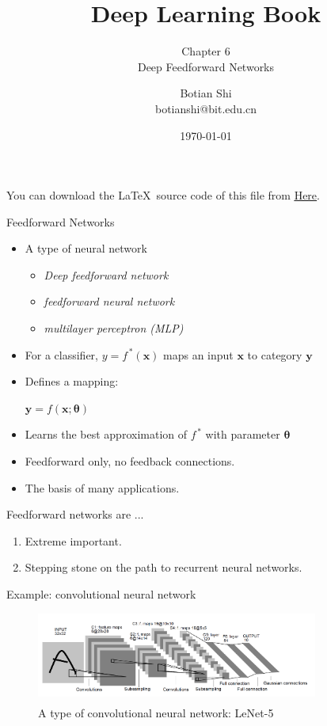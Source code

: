 \documentclass[10pt]{beamer}
\newcommand{\supercite}[1]{\textsuperscript{\textsuperscript{\cite{#1}}}}
\begin{document}
	\title{Deep Learning Book}
	\subtitle{Chapter 6 \\ Deep Feedforward Networks}
	\author{Botian Shi \\ botianshi@bit.edu.cn}
	\date{\today}

	\begin{frame}[plain]
		\titlepage
	\end{frame}

	\begin{frame}
		You can download the \LaTeX\, source code of this file from \href{https://github.com/friskit-china/DLBookSlides}{\underline{Here}}.
	\end{frame}
	
	\begin{frame}{Feedforward Networks}
		
		\begin{itemize}
			\item A type of neural network
				\begin{itemize}
					\item \emph{Deep feedforward network}
					\item \emph{feedforward neural network}
					\item \emph{multilayer perceptron (MLP)}
				\end{itemize}
			\item For a classifier, $y = f^{\,*}(\bm{x})$ maps an input $\bm{x}$ to category $\bm{y}$
			\item Defines a mapping:
					\begin{center}
						$\bm{y}=f(\bm{x};\bm{\theta})$
					\end{center}
			\item Learns the best approximation of $f^{\,*}$ with parameter $\bm{\theta}$
			\item Feedforward only, no feedback connections.
			\item The basis of many applications.
		\end{itemize}
	\end{frame}

	\begin{frame}{Feedforward networks are ...}
		\begin{enumerate}
			\item Extreme important.
			\item Stepping stone on the path to recurrent neural networks.
		\end{enumerate}
		\begin{exampleblock}{Example: convolutional neural network}
			\begin{figure}
				\includegraphics[width=25em]{figures/lenet-5.png}
				\caption{A type of convolutional neural network: LeNet-5\supercite{lecun1998gradient}}
			\end{figure}
		\end{exampleblock}
	\end{frame}
\end{document}
